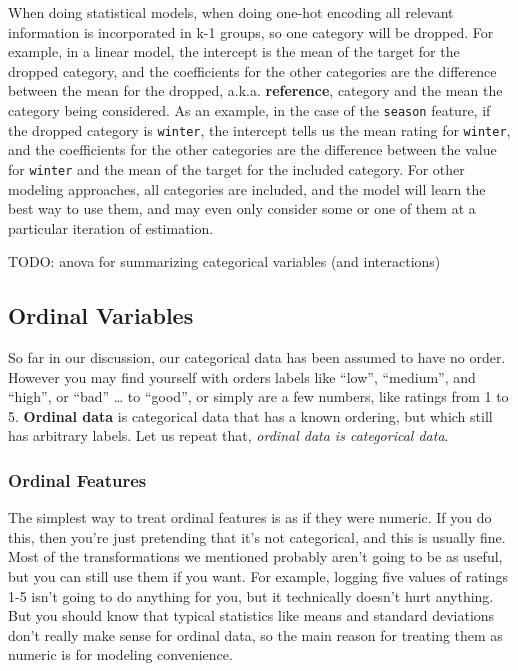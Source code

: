 \documentclass[
  letterpaper,
]{krantz}
\begin{document}
\begin{tcolorbox}[enhanced jigsaw, bottomrule=.15mm, rightrule=.15mm, colframe=quarto-callout-note-color-frame, colback=white, breakable, arc=.35mm, left=2mm, opacityback=0, leftrule=.75mm, toprule=.15mm]

When doing statistical models, when doing one-hot encoding all relevant
information is incorporated in k-1 groups, so one category will be
dropped. For example, in a linear model, the intercept is the mean of
the target for the dropped category, and the coefficients for the other
categories are the difference between the mean for the dropped, a.k.a.
\textbf{reference}, category and the mean the category being considered.
As an example, in the case of the \texttt{season} feature, if the
dropped category is \texttt{winter}, the intercept tells us the mean
rating for \texttt{winter}, and the coefficients for the other
categories are the difference between the value for \texttt{winter} and
the mean of the target for the included category. For other modeling
approaches, all categories are included, and the model will learn the
best way to use them, and may even only consider some or one of them at
a particular iteration of estimation.

\end{tcolorbox}

TODO: anova for summarizing categorical variables (and interactions)

\subsection{Ordinal Variables}\label{sec-data-ordinal}

So far in our discussion, our categorical data has been assumed to have
no order. However you may find yourself with orders labels like ``low'',
``medium'', and ``high'', or ``bad'' \ldots{} to ``good'', or simply are
a few numbers, like ratings from 1 to 5. \textbf{Ordinal data} is
categorical data that has a known ordering, but which still has
arbitrary labels. Let us repeat that, \emph{ordinal data is categorical
data}.

\subsubsection{Ordinal Features}\label{ordinal-features}

The simplest way to treat ordinal features is as if they were numeric.
If you do this, then you're just pretending that it's not categorical,
and this is usually fine. Most of the transformations we mentioned
probably aren't going to be as useful, but you can still use them if you
want. For example, logging five values of ratings 1-5 isn't going to do
anything for you, but it technically doesn't hurt anything. But you
should know that typical statistics like means and standard deviations
don't really make sense for ordinal data, so the main reason for
treating them as numeric is for modeling convenience.
\end{document}

